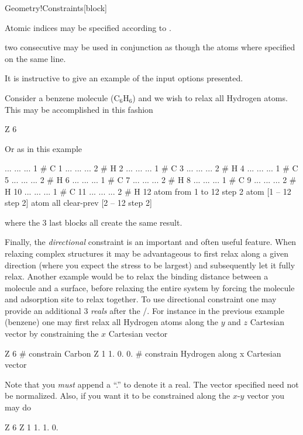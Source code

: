 \begin{fdfentry}{Geometry!Constraints}[block]
\begin{fdfoptions}
    Atomic indices may be specified according to .

    \note two consecutive  may be used in conjunction
    as though the atoms where specified on the same line.

  \end{fdfoptions}

  It is instructive to give an example of the input options presented.

  Consider a benzene molecule ($\mathrm{C}_6\mathrm{H}_6$) and we wish
  to relax all Hydrogen atoms. This may be accomplished in this fashion
  \begin{fdfexample}
      Z 6
  \end{fdfexample}
  Or as in this example
  \begin{fdfexample}
      ... ... ... 1   # C 1
      ... ... ... 2   # H 2
      ... ... ... 1   # C 3
      ... ... ... 2   # H 4
      ... ... ... 1   # C 5
      ... ... ... 2   # H 6
      ... ... ... 1   # C 7
      ... ... ... 2   # H 8
      ... ... ... 1   # C 9
      ... ... ... 2   # H 10
      ... ... ... 1   # C 11
      ... ... ... 2   # H 12
      atom from 1 to 12 step 2
      atom [1 -- 12 step 2]
      atom all
      clear-prev [2 -- 12 step 2]
  \end{fdfexample}
  where the 3 last blocks all create the same result.

  Finally, the \emph{directional} constraint is an important and often
  useful feature. 
  When relaxing complex structures it may be advantageous to first
  relax along a given direction (where you expect the stress to be
  largest) and subsequently let it fully relax. Another example would
  be to relax the binding distance between a molecule and a surface,
  before relaxing the entire system by forcing the molecule and
  adsorption site to relax together.
  To use directional constraint one may provide an additional 3
  \emph{reals} after the /.
  For instance in the previous example (benzene) one may first relax
  all Hydrogen atoms along the $y$ and $z$ Cartesian vector by
  constraining the $x$ Cartesian vector
  \begin{fdfexample}
      Z 6 # constrain Carbon
      Z 1 1. 0. 0. # constrain Hydrogen along x Cartesian vector
  \end{fdfexample}
  Note that you \emph{must} append a ``.'' to denote it a real. The
  vector specified need not be normalized. Also, if you want it to
  be constrained along the $x$-$y$ vector you may do
  \begin{fdfexample}
      Z 6
      Z 1 1. 1. 0.
  \end{fdfexample}
  
\end{fdfentry}



